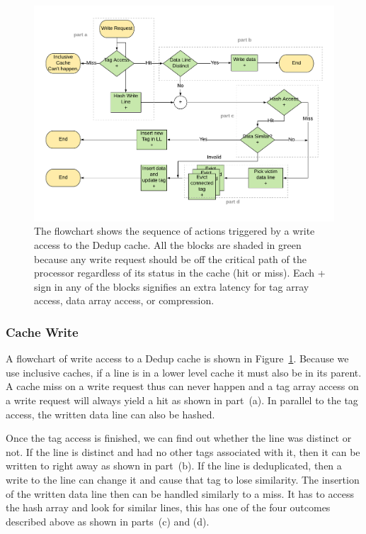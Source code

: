 \begin{figure}[h]
    \includegraphics[width=\textwidth]{Dedup_Write.pdf}
    \caption[Dedup Write]{The flowchart shows the sequence of actions triggered by a write access to the Dedup cache. All the blocks are shaded in green because any write request should be off the critical path of the processor regardless of its status in the cache (hit or miss). Each + sign in any of the blocks signifies an extra latency for tag array access, data array access, or compression.}
    \label{fig:Dedup_Write}
\end{figure}
\subsubsection{Cache Write}
A flowchart of write access to a Dedup cache is shown in Figure~\ref{fig:Dedup_Write}. Because we use inclusive caches, if a line is in a lower level cache it must also be in its parent. A cache miss on a write request thus can never happen and a tag array access on a write request will always yield a hit as shown in part~(a). In parallel to the tag access, the written data line can also be hashed.\par
Once the tag access is finished, we can find out whether the line was distinct or not. If the line is distinct and had no other tags associated with it, then it can be written to right away as shown in part~(b). If the line is deduplicated, then a write to the line can change it and cause that tag to lose similarity. The insertion of the written data line then can be handled similarly to a miss. It has to access the hash array and look for similar lines, this has one of the four outcomes described above as shown in parts~(c) and (d).

